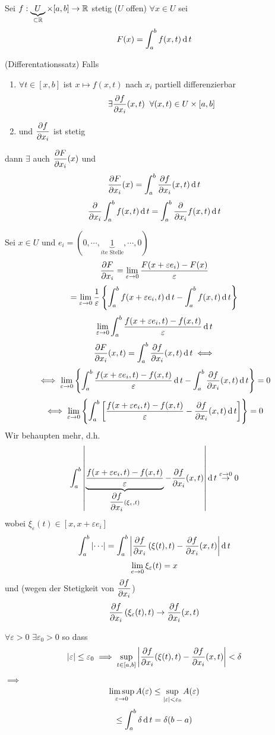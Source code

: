 Sei $f:\underbrace{U}_{\subset \mathbb{R}}\times [a,b]\rightarrow\mathbb{R}$ stetig ($U$ offen) $\forall x\in U$ sei
\[F(x)=\int_a^bf(x,t)\operatorname{d} t\]
\begin{Sat}
  (Differentationssatz) Falls
  \begin{enumerate}
    \item $\forall t\in \left[ x,b \right]$ ist $x\mapsto f(x,t)$ nach $x_i$ partiell differenzierbar
      \[\exists\dfrac{\partial f}{\partial x_i}(x,t)\hspace{2mm}\forall (x,t)\in U\times \left[ a,b \right]\]
    \item und $\dfrac{\partial f}{\partial x_i}$ ist stetig
  \end{enumerate}
  dann $\exists$ auch $\dfrac{\partial F}{\partial x_i}(x)$ und
  \[\dfrac{\partial F}{\partial x_i}(x)=\int_a^b\dfrac{\partial f}{\partial x_i}(x,t)\operatorname{d} t\]
  \[\dfrac{\partial }{\partial x_i}\int_a^bf(x,t)\operatorname{d} t=\int_a^b\dfrac{\partial }{\partial x_i}f(x,t)\operatorname{d} t\]
\end{Sat}
\begin{Bew}
  Sei $x\in U$ und $e_i=(0,\cdots,\underbrace{1}_{i\text{te Stelle}},\cdots,0)$
  \[\dfrac{\partial F}{\partial x_i}=\displaystyle\lim_{\varepsilon\rightarrow0}\frac{F(x+\varepsilon e_i)-F(x)}{\varepsilon}\]
  \[=\displaystyle\lim_{\varepsilon\rightarrow0}\frac{1}{\varepsilon}\left\{ \int_a^bf(x+\varepsilon e_i ,t)\operatorname{d} t-\int_a^bf(x,t)\operatorname{d} t \right\}\]
  \[\displaystyle\lim_{\varepsilon\rightarrow0}\int_a^b\frac{f(x+\varepsilon e_i,t)-f(x,t)}{\varepsilon}\operatorname{d} t\]
  \[\dfrac{\partial F}{\partial x_i}(x,t)=\int_a^b\dfrac{\partial f}{\partial x_i}(x,t)\operatorname{d} t\iff\]
  \[\iff \displaystyle\lim_{\varepsilon\rightarrow0}\left\{ \int_a^b\frac{f(x+\varepsilon e_i,t)-f(x,t)}{\varepsilon}\operatorname{d} t-\int_a^b\dfrac{\partial f}{\partial x_i}(x,t)\operatorname{d} t \right\}=0\]
  \[\iff \displaystyle\lim_{\varepsilon\rightarrow0}\left\{ \int_a^b\left[ \frac{f(x+\varepsilon e_i,t)-f(x,t)}{\varepsilon}-\dfrac{\partial f}{\partial x_i}(x,t)\operatorname{d} t \right] \right\}=0\]
  Wir behaupten mehr, d.h.
  \[\int_a^b\left|  \underbrace{\frac{f(x+\varepsilon e_i,t)-f(x,t)}{\varepsilon}}_{\dfrac{\partial f}{\partial x_i}(\xi_\varepsilon,t)}-\dfrac{\partial f}{\partial x_i}(x,t) \right|\operatorname{d} t\stackrel{\varepsilon\rightarrow 0}{\rightarrow}0\]
  wobei $\xi_\varepsilon(t)\in \left[ x,x+\varepsilon e_i \right]$
  \[\int_a^b\Abs{\cdots}=\int_a^b\Abs{\Part{f}{x_i}\left( \xi(t),t \right)-\Part{f}{x_i}(x,t)}\md t\]
  \[\displaystyle\lim_{e\rightarrow0}\xi_\varepsilon(t)=x\]
  und (wegen der Stetigkeit von $\dfrac{\partial f}{\partial x_i}$)
  \[\dfrac{\partial f}{\partial x_i}\left( \xi_\varepsilon(t),t \right)\rightarrow \dfrac{\partial f}{\partial x_i}(x,t)\]
  \begin{Beh}
    $\forall \varepsilon>0$ $\exists \varepsilon_0>0$ so dass
    \[\left| \varepsilon \right|\leq \varepsilon_0\implies \sup_{t\in [a,b]}\left| \dfrac{\partial f}{\partial x_i}(\xi(t),t)-\dfrac{\partial f}{\partial x_i}(x,t) \right|<\delta\]
  \end{Beh}
  $\implies$
  \[\limsup_{\varepsilon\rightarrow 0} A(\varepsilon)\leq \sup_{\left| \varepsilon \right|<\varepsilon_0}A(\varepsilon)\]
  \[\leq \int_a^b\delta\operatorname{d} t=\delta(b-a)\]

\end{Bew}

